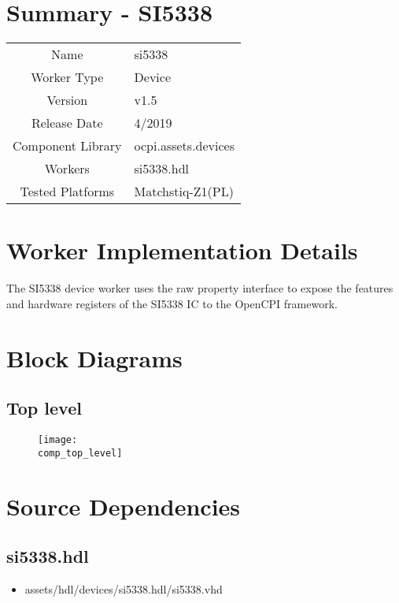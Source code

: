 \documentclass{article}
\author{} %
\date{Version \docVersion} %
\title{\docTitle}
\def\docVersion{1.5}
\def\comp{si5338}
\def\Comp{SI5338}
\begin{document}
\section*{Summary - \Comp}
\begin{tabular}{|c|M{13.5cm}|}
	\hline
	                  &                                        \\
	\hline
	Name              & \comp                                  \\
	\hline
	Worker Type       & Device                                 \\
	\hline
	Version           & v\docVersion \\
	\hline
	Release Date      & 4/2019 \\
	\hline
	Component Library & ocpi.assets.devices                     \\
	\hline
	Workers           & \comp.hdl                              \\
	\hline
	Tested Platforms  & Matchstiq-Z1(PL)                       \\
	\hline
\end{tabular}

\section*{Worker Implementation Details}
The \Comp{} device worker uses the raw property interface to expose the features and hardware registers of the \Comp{} IC to the OpenCPI framework.

\section*{Block Diagrams}
\subsection*{Top level}
\begin{figure}[ht]
	\centerline{\texttt{[image: \\comp\_top\_level]}}
	\label{fig:tb}
\end{figure}

\section*{Source Dependencies}
\subsection*{\comp.hdl}
\begin{itemize}
	\item assets/hdl/devices/\comp.hdl/\comp.vhd
\end{itemize}
\end{document}
